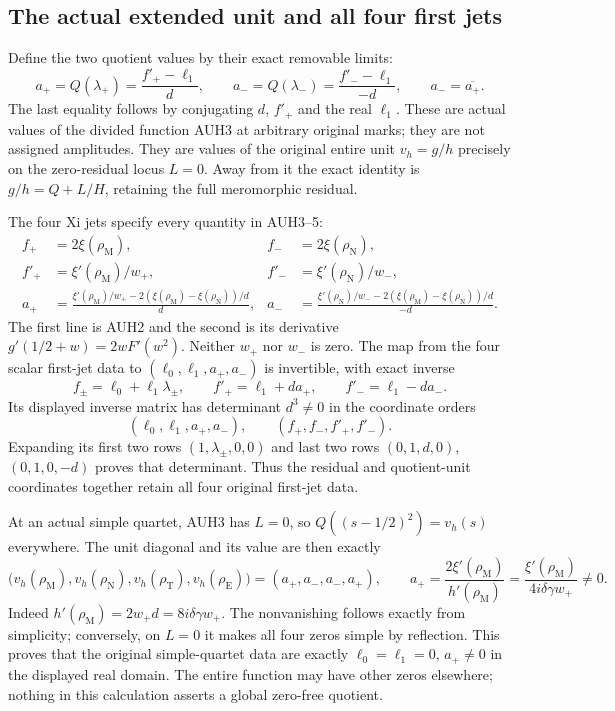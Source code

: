 \documentclass[11pt]{article}
\begin{document}
\subsection{The actual extended unit and all four first jets}

Define the two quotient values by their exact removable limits:
\[
 a_+=Q(\lambda_+)=\frac{f'_+-\ell_1}{d},\qquad
 a_-=Q(\lambda_-)=\frac{f'_--\ell_1}{-d},\qquad
 a_-=\overline{a_+}.
 \tag{AUH5}
\]
The last equality follows by conjugating $d$, $f'_+$ and the real
$\ell_1$.  These are actual values of the divided function AUH3 at
arbitrary original marks; they are not assigned amplitudes.
They are values of the original entire unit $v_h=g/h$ precisely on
the zero-residual locus $L=0$.  Away from it the exact identity is
$g/h=Q+L/H$, retaining the full meromorphic residual.

The four Xi jets specify every quantity in AUH3--5:
\[
\begin{aligned}
 f_+&=2\xi(\rho_{\mathrm M}),&f_-&=2\xi(\rho_{\mathrm N}),\\
 f'_+&=\xi'(\rho_{\mathrm M})/w_+,&
 f'_-&=\xi'(\rho_{\mathrm N})/w_-,\\
 a_+&=\frac{\xi'(\rho_{\mathrm M})/w_+
       -2(\xi(\rho_{\mathrm M})-\xi(\rho_{\mathrm N}))/d}{d},&
 a_-&=\frac{\xi'(\rho_{\mathrm N})/w_-
       -2(\xi(\rho_{\mathrm M})-\xi(\rho_{\mathrm N}))/d}{-d}.
\end{aligned}\tag{AUH6}
\]
The first line is AUH2 and the second is its derivative
$g'(1/2+w)=2wF'(w^2)$.  Neither $w_+$ nor $w_-$ is zero.
The map from the four scalar first-jet data to
$(\ell_0,\ell_1,a_+,a_-)$ is invertible, with exact inverse
\[
 f_\pm=\ell_0+\ell_1\lambda_\pm,\qquad
 f'_+=\ell_1+d a_+,\qquad f'_-=\ell_1-d a_-.
 \tag{AUH7}
\]
Its displayed inverse matrix has determinant $d^3\ne0$ in the
coordinate orders
\[
 (\ell_0,\ell_1,a_+,a_-),\qquad (f_+,f_-,f'_+,f'_-).
\]
Expanding its first two rows $(1,\lambda_\pm,0,0)$ and last two
rows $(0,1,d,0)$, $(0,1,0,-d)$ proves that determinant.
Thus the residual and quotient-unit coordinates together retain
all four original first-jet data.

At an actual simple quartet, AUH3 has $L=0$, so $Q((s-1/2)^2)=v_h(s)$
everywhere.  The unit diagonal and its value are then exactly
\[
 \bigl(v_h(\rho_{\mathrm M}),v_h(\rho_{\mathrm N}),
        v_h(\rho_{\mathrm T}),v_h(\rho_{\mathrm E})\bigr)
       =(a_+,a_-,a_-,a_+),\qquad
 a_+=\frac{2\xi'(\rho_{\mathrm M})}{h'(\rho_{\mathrm M})}
     =\frac{\xi'(\rho_{\mathrm M})}{4i\delta\gamma w_+}\ne0.
 \tag{AUH8}
\]
Indeed $h'(\rho_{\mathrm M})=2w_+d=8i\delta\gamma w_+$.
The nonvanishing follows exactly from simplicity; conversely, on
$L=0$ it makes all four zeros simple by reflection.
This proves that the original simple-quartet data are exactly
$\ell_0=\ell_1=0$, $a_+\ne0$ in the displayed real domain.
The entire function may have other zeros elsewhere; nothing in
this calculation asserts a global zero-free quotient.
\end{document}
